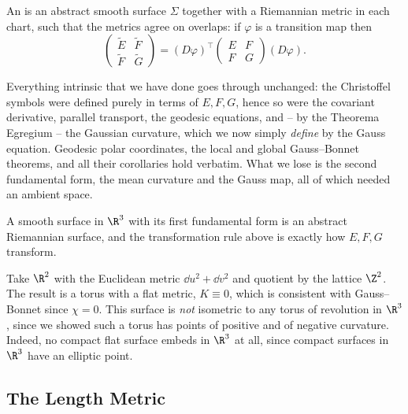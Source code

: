 \begin{definition}
    An  is an abstract smooth surface $\Sigma$ together with a Riemannian metric in each chart, such that the metrics agree on overlaps: if $\varphi$ is a transition map then
    $$
    \begin{pmatrix} \tilde E & \tilde F \\ \tilde F & \tilde G\end{pmatrix} = \left(D\varphi\right)^\top \begin{pmatrix} E & F \\ F & G \end{pmatrix} \left(D\varphi\right).
    $$
\end{definition}

Everything intrinsic that we have done goes through unchanged: the Christoffel symbols were defined purely in terms of $E, F, G$, hence so were the covariant derivative, parallel transport, the geodesic equations, and -- by the Theorema Egregium -- the Gaussian curvature, which we now simply \emph{define} by the Gauss equation. Geodesic polar coordinates, the local and global Gauss--Bonnet theorems, and all their corollaries hold verbatim. What we lose is the second fundamental form, the mean curvature and the Gauss map, all of which needed an ambient space.

\begin{example}[Surfaces in $\R^3$]
    A smooth surface in $\R^3$ with its first fundamental form is an abstract Riemannian surface, and the transformation rule above is exactly how $E, F, G$ transform.
\end{example}

\begin{example}
    Take $\R^2$ with the Euclidean metric $\dd u^2 + \dd v^2$ and quotient by the lattice $\Z^2$. The result is a torus with a flat metric, $K \equiv 0$, which is consistent with Gauss--Bonnet since $\chi = 0$. This surface is \emph{not} isometric to any torus of revolution in $\R^3$, since we showed such a torus has points of positive and of negative curvature. Indeed, no compact flat surface embeds in $\R^3$ at all, since compact surfaces in $\R^3$ have an elliptic point.
\end{example}

\subsection{The Length Metric}

